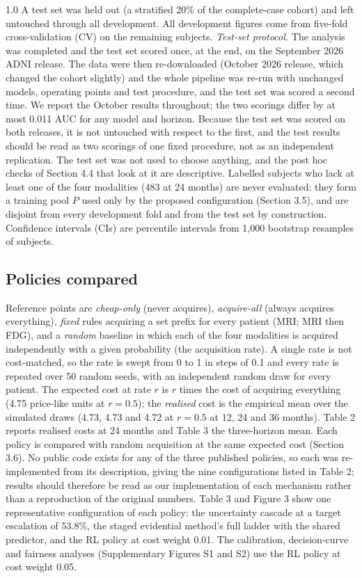 \documentclass[12pt,twoside]{article}
\begin{document}
\begin{spacing}{1.0}
A test set was held out (a stratified 20\% of the complete-case cohort) and
left untouched through all development. All development figures come from
five-fold cross-validation (CV) on the remaining subjects.
\emph{Test-set protocol.} The analysis was completed and the test set scored
once, at the end, on the September 2026 ADNI release. The data were then
re-downloaded (October 2026 release, which changed the cohort slightly) and
the whole pipeline was re-run with unchanged models, operating points and test
procedure, and the test set was scored a second time. We report the October
results throughout; the two scorings differ by at most 0.011 AUC for any
model and horizon. Because the test set was scored on both releases, it is
not untouched with respect to the first, and the test results should be read
as two scorings of one fixed procedure, not as an independent replication.
The test set was not used to choose anything, and the post hoc checks of
Section 4.4 that look at it are descriptive.
Labelled subjects who lack at least one of the four modalities (483 at 24
months) are never evaluated: they form a training pool $P$ used only by the
proposed configuration (Section 3.5), and are disjoint from every
development fold and from the test set by construction. Confidence
intervals (CIs) are percentile intervals from 1,000 bootstrap resamples of
subjects.

\subsection{Policies compared}
Reference points are \emph{cheap-only} (never acquires), \emph{acquire-all}
(always acquires everything), \emph{fixed} rules acquiring a set prefix for
every patient (MRI; MRI then FDG), and a \emph{random} baseline in which each
of the four modalities is acquired independently with a given probability
(the acquisition rate). A single rate is not cost-matched, so the rate is
swept from 0 to 1 in steps of 0.1 and every rate is repeated over 50 random
seeds, with an independent random draw for every patient. The expected cost
at rate $r$ is $r$ times the cost of acquiring everything (4.75 price-like
units at $r=0.5$); the \emph{realised} cost is the empirical mean over the
simulated draws (4.73, 4.73 and 4.72 at $r=0.5$ at 12, 24 and 36 months).
Table 2 reports realised costs at 24 months and Table 3 the three-horizon
mean. Each policy is compared with random acquisition at the same expected
cost (Section 3.6). No public code exists for any of the three published policies, so each was
re-implemented from its description, giving the nine configurations listed in
Table 2; results should therefore be read as our implementation of each
mechanism rather than a reproduction of the original numbers. Table 3 and
Figure 3 show one representative configuration of each policy: the
uncertainty cascade at a target escalation of 53.8\%, the staged evidential method's full
ladder with the shared predictor, and the RL policy at cost weight 0.01. The
calibration, decision-curve and fairness analyses (Supplementary Figures S1 and S2) use the
RL policy at cost weight 0.05.


\end{spacing}
\end{document}
